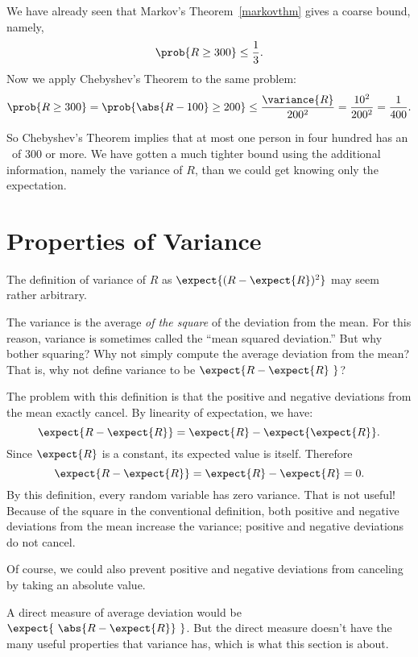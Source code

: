 We have already seen that Markov's Theorem~\ref{markovthm} gives a coarse
bound, namely,
\[
  \prob{R \geq 300} \leq \frac{1}{3}.
\]
Now we apply Chebyshev's Theorem to the same problem:
\[
\prob{R \geq 300} = \prob{\abs{R - 100} \geq 200} \leq
\frac{\variance{R}}{200^2} = \frac{10^2}{200^2} = \frac{1}{400}.
\]
\iffalse
The purpose of the first step is to express the desired probability in the
form required by Chebyshev's Theorem; the equality holds because $R$ is
nonnegative.  Chebyshev's Theorem then yields the inequality.\fi

So Chebyshev's Theorem implies that at most one person in four hundred has
an \IQ\ of 300 or more.  We have gotten a much tighter bound using the
additional information, namely the variance of $R$, than we could get
knowing only the expectation.

\section{Properties of Variance}\label{variance_sec}

The definition of variance of $R$ as $\expect{(R - \expect{R})^2}$ may
seem rather arbitrary.
%
\begin{editingnotes}

The variance is the average \emph{of the square} of the deviation from the
mean.  For this reason, variance is sometimes called the ``mean squared
deviation.''  But why bother squaring?  Why not simply compute the average
deviation from the mean?  That is, why not define variance to be
$\expect{R - \expect{R}\ }$?

The problem with this definition is that the positive and negative
deviations from the mean exactly cancel.  By linearity of expectation,
we have:
\[
  \expect{R - \expect{R}} = \expect{R} - \expect{\expect{R}}.
\]
Since $\expect{R}$ is a constant, its expected value is itself. Therefore
\[
\expect{R - \expect{R}} = \expect{R} - \expect{R} = 0.
\]
By this definition, every random variable has zero variance.  That is not
useful!  Because of the square in the conventional definition, both
positive and negative deviations from the mean increase the variance;
positive and negative deviations do not cancel.

Of course, we could also prevent positive and negative deviations from
canceling by taking an absolute value.
\end{editingnotes}
%
A direct measure of average deviation would be $\expect{\ \abs{R -
    \expect{R}}\ }$.  But the direct measure doesn't have the many useful
properties that variance has, which is what this section is about.

